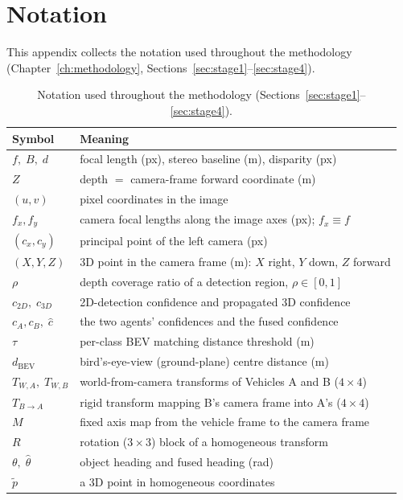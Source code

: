 \chapter{Notation}
\label{app:notation}

This appendix collects the notation used throughout the methodology
(Chapter~\ref{ch:methodology}, Sections~\ref{sec:stage1}--\ref{sec:stage4}).

\begin{table}[htbp]
\centering
\caption{Notation used throughout the methodology (Sections~\ref{sec:stage1}--\ref{sec:stage4}).}
\label{tab:notation}
\begin{tabularx}{\textwidth}{@{}lL@{}}
\toprule
\textbf{Symbol} & \textbf{Meaning} \\
\midrule
$f,\; B,\; d$ & focal length (px), stereo baseline (m), disparity (px) \\
$Z$ & depth $=$ camera-frame forward coordinate (m) \\
$(u, v)$ & pixel coordinates in the image \\
$f_x, f_y$ & camera focal lengths along the image axes (px); $f_x \equiv f$ \\
$(c_x, c_y)$ & principal point of the left camera (px) \\
$(X, Y, Z)$ & 3D point in the camera frame (m): $X$ right, $Y$ down, $Z$ forward \\
$\rho$ & depth coverage ratio of a detection region, $\rho \in [0, 1]$ \\
$c_{2D},\; c_{3D}$ & 2D-detection confidence and propagated 3D confidence \\
$c_A, c_B,\; \hat{c}$ & the two agents' confidences and the fused confidence \\
$\tau$ & per-class BEV matching distance threshold (m) \\
$d_{\text{BEV}}$ & bird's-eye-view (ground-plane) centre distance (m) \\
$T_{W,A},\; T_{W,B}$ & world-from-camera transforms of Vehicles A and B ($4\times4$) \\
$T_{B \rightarrow A}$ & rigid transform mapping B's camera frame into A's ($4\times4$) \\
$M$ & fixed axis map from the vehicle frame to the camera frame \\
$R$ & rotation ($3\times3$) block of a homogeneous transform \\
$\theta,\; \hat{\theta}$ & object heading and fused heading (rad) \\
$\tilde{p}$ & a 3D point in homogeneous coordinates \\
\bottomrule
\end{tabularx}
\end{table}
